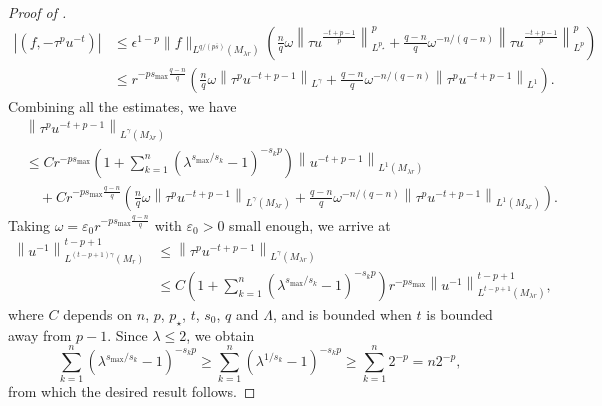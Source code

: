 \documentclass[10pt,a4paper]{amsart}
\begin{document}
\begin{proof} [Proof of ]
\begin{equation*}
\begin{split}
|(f, -\tau^p u^{-t})|
&\leq \epsilon^{1-p} \|f\|_{L^{q/(p\bar{s})}(M_{\lambda r})} \left( \frac{n}{q} \omega \left\| \tau u^{\frac{-t+p-1}{p}} \right\|_{L^{p_\star}}^p + \frac{q-n}{q} \omega^{-n/(q-n)} \left\|\tau u^{\frac{-t+p-1}{p}} \right\|_{L^p}^p \right) \\
&\leq r^{-ps_{\max}\frac{q-n}{q}} \left( \frac{n}{q} \omega \left\| \tau^p u^{-t+p-1} \right\|_{L^{\gamma}} + \frac{q-n}{q} \omega^{-n/(q-n)} \left\|\tau^p u^{-t+p-1} \right\|_{L^1} \right).
\end{split}
\end{equation*}
Combining all the estimates, we have
\begin{equation*}
\begin{split}
&\left\|\tau^p u^{-t+p-1} \right\|_{L^{\gamma}(M_{\lambda r})} \\
&\leq C r^{-ps_{\max}}\left( 1+\sum_{k=1}^n \left( \lambda^{s_{\max}/s_k}-1 \right)^{-s_k p} \right) \left\|u^{-t+p-1}\right\|_{L^1(M_{\lambda r})} \\
&\quad +Cr^{-ps_{\max}\frac{q-n}{q}} \left( \frac{n}{q} \omega \left\| \tau^p u^{-t+p-1} \right\|_{L^{\gamma}(M_{\lambda r})} + \frac{q-n}{q} \omega^{-n/(q-n)} \left\|\tau^p u^{-t+p-1} \right\|_{L^1(M_{\lambda r})} \right).
\end{split}
\end{equation*}
Taking $\omega = \varepsilon_0 r^{-ps_{\max}\frac{q-n}{q}}$ with $\varepsilon_0 > 0$ small enough, we arrive at
\begin{equation*}
\begin{split}
\left\| u^{-1} \right\|_{L^{(t-p+1)\gamma}(M_r)}^{t-p+1}
&\leq \left\|\tau^p u^{-t+p-1} \right\|_{L^{\gamma}(M_{\lambda r})} \\
&\leq C\left( 1+\sum_{k=1}^n \left( \lambda^{s_{\max}/s_k}-1 \right)^{-s_k p} \right) r^{-ps_{\max}} \left\|u^{-1}\right\|_{L^{t-p+1}(M_{\lambda r})}^{t-p+1},
\end{split}
\end{equation*}
where $C$ depends on $n$, $p$, $p_{\star}$, $t$, $s_0$, $q$ and $\Lambda$, and is bounded when $t$ is bounded away from $p-1$. Since $\lambda \leq 2$, we obtain
\begin{equation*}
\sum_{k=1}^n \left( \lambda^{s_{\max}/s_k}-1 \right)^{-s_k p} \geq \sum_{k=1}^n \left( \lambda^{1/s_k}-1 \right)^{-s_k p} \geq \sum_{k=1}^n 2^{-p} = n2^{-p},
\end{equation*}
from which the desired result follows.
\end{proof}
\end{document}
